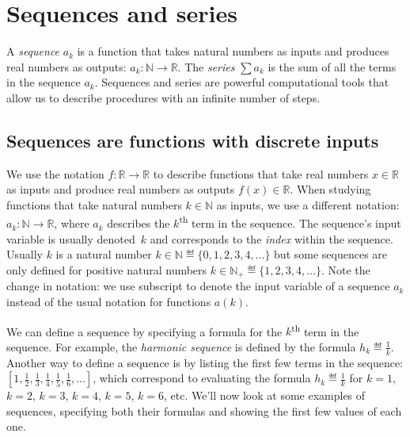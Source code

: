 
\section{Sequences and series}
\label{sec:sequences_and_series}

	A \emph{sequence} $a_k$ is a function that takes natural numbers as inputs
	and produces real numbers as outputs: $a_k : \mathbb{N} \to \mathbb{R}$.
	The \emph{series} $\sum a_k$ is the sum of all the terms in the sequence $a_k$.
	Sequences and series are powerful computational tools 
	that allow us to describe procedures with an infinite number of steps.

	\subsection{Sequences are functions with discrete inputs}
	\label{sequences_and_series:sequences}

		We use the notation $f: \mathbb{R} \to \mathbb{R}$
		to describe functions that take real numbers $x \in \mathbb{R}$ as inputs
		and produce real numbers as outputs $f(x) \in \mathbb{R}$.
		When studying functions that take natural numbers $k \in \mathbb{N}$ as inputs,
		we use a different notation: $a_k: \mathbb{N} \to \mathbb{R}$,
		where $a_k$ describes the $k$\textsuperscript{th} term in the sequence.
		The sequence's input variable is usually denoted~$k$
		and corresponds to the \emph{index} within the sequence.
		Usually $k$ is a natural number $k \in \mathbb{N} \eqdef \{0,1,2,3,4,\ldots\}$
		but some sequences are only defined for positive natural numbers
		$k \in \mathbb{N}_+ \eqdef \{1,2,3,4,\ldots\}$.
		Note the change in notation:
		we use subscript to denote the input variable of a sequence $a_k$
		instead of the usual notation for functions $a(k)$.

		We can define a sequence by specifying a formula for the $k$\textsuperscript{th} term in the sequence.
		For example,
		the \emph{harmonic sequence} is defined by the formula $h_k \eqdef \frac{1}{k}$.
		Another way to define a sequence is by listing the first few terms in the sequence:
		$[1, \tfrac{1}{2}, \tfrac{1}{3}, \tfrac{1}{4}, \tfrac{1}{5}, \tfrac{1}{6},  \ldots]$,
		which correspond to evaluating the formula $h_k \eqdef \frac{1}{k}$
		for $k\!=\!1$, $k\!=\!2$, $k\!=\!3$, $k\!=\!4$, $k\!=\!5$, $k\!=\!6$, etc.
		We'll now look at some examples of sequences,
		specifying both their formulas
		and showing the first few values of each one.


